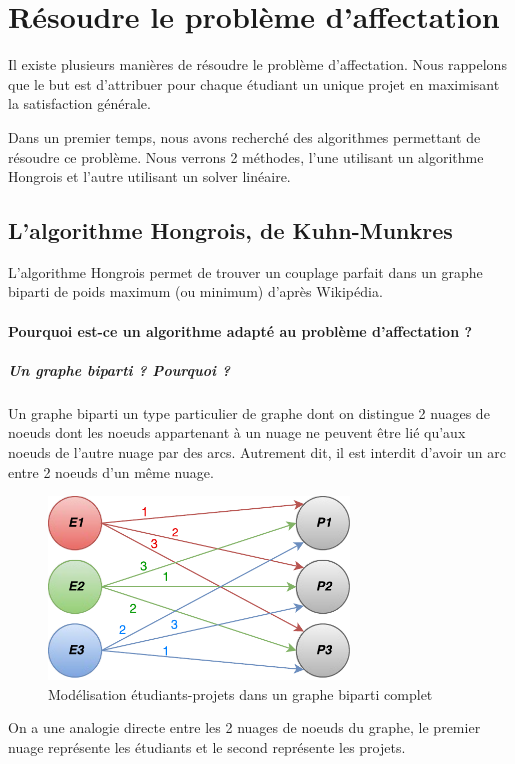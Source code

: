 \documentclass[final,poster]{polytech/polytech}
\begin{document}
\section{Résoudre le problème d'affectation}
Il existe plusieurs manières de résoudre le problème d'affectation.
Nous rappelons que le but est d'attribuer pour chaque étudiant un unique projet en maximisant la satisfaction générale.

Dans un premier temps, nous avons recherché des algorithmes permettant de résoudre ce problème. Nous verrons 2 méthodes, l'une utilisant un algorithme Hongrois et l'autre utilisant un solver linéaire.

\subsection{L'algorithme Hongrois, de Kuhn-Munkres}

L'algorithme Hongrois permet de trouver un couplage parfait dans un graphe biparti de poids maximum (ou minimum) d'après Wikipédia.

\paragraph{Pourquoi est-ce un algorithme adapté au problème d'affectation ?}

\subparagraph{Un graphe biparti ? Pourquoi ?}
Un graphe biparti un type particulier de graphe dont on distingue 2 nuages de noeuds dont les noeuds appartenant à un nuage ne peuvent être lié qu'aux noeuds de l'autre nuage par des arcs. 
Autrement dit, il est interdit d'avoir un arc entre 2 noeuds d'un même nuage.

\begin{figure}[htbp]
\includegraphics[width=8cm]{images/Graphe_bipartie}
\caption{\label{fig:graphe_biparti}Modélisation étudiants-projets dans un graphe biparti complet}
\end{figure}

On a une analogie directe entre les 2 nuages de noeuds du graphe, le premier nuage représente les étudiants et le second représente les projets.
\end{document}
